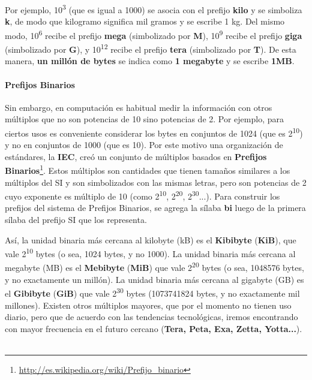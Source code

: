 \documentclass[a4paper]{article}
\begin{document}
Por ejemplo, 10\textsuperscript{3} (que es igual a 1000) se asocia con
el prefijo \textbf{kilo} y se simboliza \textbf{k}, de modo que
kilogramo significa mil gramos y se escribe 1 kg. Del mismo modo,
10\textsuperscript{6} recibe el prefijo \textbf{mega} (simbolizado por \textbf{M}),
10\textsuperscript{9} recibe el prefijo \textbf{giga} (simbolizado por \textbf{G}),
y 10\textsuperscript{12} recibe el prefijo
\textbf{tera} (simbolizado por \textbf{T}). De esta manera, \textbf{un
millón de bytes }se indica como \textbf{1 megabyte} y se escribe
\textbf{1MB}.

\paragraph{Prefijos Binarios}
Sin embargo, en computación es habitual medir la información con
otros múltiplos que no son potencias de 10 sino potencias de 2. Por
ejemplo, para ciertos usos es conveniente considerar los bytes en
conjuntos de 1024 (que es 2\textsuperscript{10}) y no en conjuntos de
1000 (que es 10{\textthreesuperior}). Por este motivo una
organización de estándares, la \textbf{IEC}, creó un conjunto de
múltiplos basados en \textbf{Prefijos
Binarios}\footnote{\url{http://es.wikipedia.org/wiki/Prefijo_binario}}.
Estos múltiplos son cantidades que tienen tamaños similares a los
múltiplos del SI y son simbolizados con las mismas letras, pero son
potencias de 2 cuyo exponente es múltiplo de 10 (como
2\textsuperscript{10}, 2\textsuperscript{20},
2\textsuperscript{30}...). Para construir los prefijos del sistema de
Prefijos Binarios, se agrega la sílaba \textbf{bi} luego de la
primera sílaba del prefijo SI que los representa.

Así, la unidad binaria más cercana al kilobyte (kB) es el
\textbf{Kibibyte} (\textbf{KiB}), que vale 2\textsuperscript{10} bytes
(o sea, 1024 bytes, y no 1000). La unidad binaria más cercana al
megabyte (MB) es el \textbf{Mebibyte} (\textbf{MiB}) que vale
2\textsuperscript{20} bytes (o sea, 1048576 bytes, y no exactamente un
millón). La unidad binaria más cercana al gigabyte (GB) es el
\textbf{Gibibyte} (\textbf{GiB}) que vale 2\textsuperscript{30} bytes
(1073741824 bytes, y no exactamente mil millones). Existen otros
múltiplos mayores, que por el momento no tienen uso diario, pero que
de acuerdo con las tendencias tecnológicas, iremos encontrando con
mayor frecuencia en el futuro cercano (\textbf{Tera, Peta, Exa, Zetta,
Yotta...}). \ 
\end{document}

